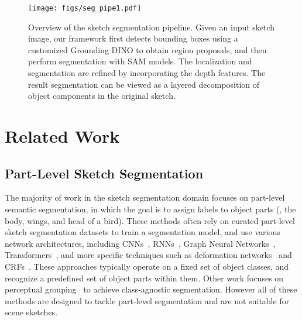 \begin{figure*}
  \centering
  \texttt{[image: figs/seg\_pipe1.pdf]}
  \vspace{-0.7cm}
  \caption{Overview of the sketch segmentation pipeline. Given an input sketch image, our framework first detects bounding boxes using a customized Grounding DINO to obtain region proposals, and then perform segmentation with SAM models. The localization and segmentation are refined by incorporating the depth features. The result segmentation can be viewed as a layered decomposition of object components in the original sketch.}  
  \label{fig:methods}
\end{figure*}

\section{Related Work}
\subsection{Part-Level Sketch Segmentation} 
The majority of work in the sketch segmentation domain focuses on part-level semantic segmentation, in which the goal is to assign labels to object parts (\eg, the body, wings, and head of a bird). These methods often rely on curated part-level sketch segmentation datasets
\cite{ge2020creative,li2018universalperceptualgrouping,Wu2018SketchsegnetAR,eitz2012hdhso,dataDrivenSeg2014} to train a segmentation model, and use various network architectures, including CNNs~\cite{Zhu2018PartLevelSS, wang2020multicolumnseg}, RNNs~\cite{sketchSegNet2019, Wu2018SketchsegnetAR, symbolReconSeg2020}, Graph Neural Networks~\cite{ENDE-GNN2022, sketchGNN2021}, Transformers~\cite{wang2024contextseg, segFormer2023}, and more specific techniques such as deformation networks~\cite{oneshot2021} and CRFs~\cite{CRFseg2016}. These approaches typically operate on a fixed set of object classes, and recognize a predefined set of object parts within them. Other work focuses on perceptual grouping~\cite{ li2018universalperceptualgrouping, Li2019TowardDU} to achieve class-agnostic segmentation. However all of these methods are designed to tackle part-level segmentation and are not suitable for scene sketches.

